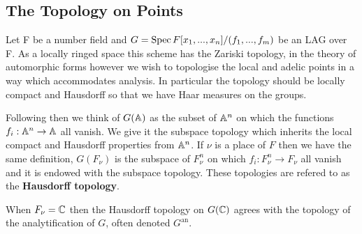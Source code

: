     \subsection{The Topology on Points}
	Let F be a number field and \(G = \operatorname{Spec} F[x_1, ..., x_n]/(f_1, ..., f_m)\) be an LAG over F. As a locally ringed space this scheme has the Zariski topology, in the theory of automorphic forms however we wish to topologise the local and adelic points in a way which accommodates analysis. In particular the topology should be locally compact and Hausdorff so that we have Haar measures on the groups. 
	
	Following \cite{conradWeilGrothendieckApproaches2012} then we think of \(G(\A)\) as the subset of \(\A^n\) on which the functions \(f_i: \A^n \to \A\) all vanish. We give it the subspace topology which inherits the local compact and Hausdorff properties from \(\A^n\). If \(\nu\) is a place of \(F\) then we have the same definition, \(G(F_\nu)\) is the subspace of \(F_\nu^n\) on which \(f_i:F_\nu^n \to F_\nu\) all vanish and it is endowed with the subspace topology.
	These topologies are refered to as the \textbf{Hausdorff topology}.
	
	\begin{remark}
		When \(F_\nu = \C\) then the Hausdorff topology on \(G(\C)\) agrees with the topology of the analytification of \(G\), often denoted \(G^{\mathrm{an}}\).
	\end{remark}


